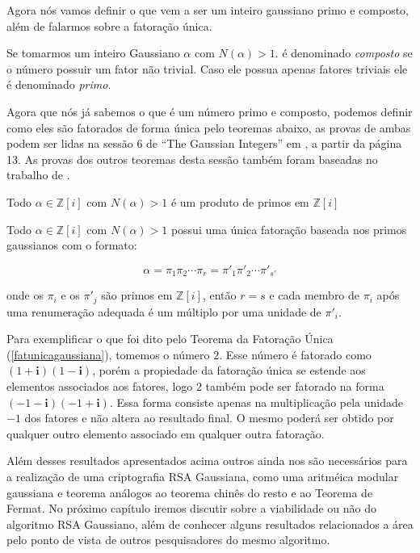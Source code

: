 Agora n\'os vamos definir o que vem a ser um inteiro gaussiano primo e composto, al\'em de falarmos sobre a fatora\c{c}\~ao \'unica.

\begin{Df}
Se tomarmos um inteiro Gaussiano $\alpha$ com $N(\alpha) > 1$. \'e denominado \textit{composto} se o n\'umero possuir um fator n\~ao trivial. Caso ele possua apenas fatores triviais ele \'e denominado \textit{primo}.
\end{Df}

Agora que n\'os j\'a sabemos o que \'e um n\'umero primo e composto, podemos definir como eles s\~ao fatorados de forma \'unica pelo teoremas abaixo, as provas de ambas podem ser lidas na sess\~ao 6 de ``The Gaussian Integers'' em \cite{conrad}, a partir da p\'agina 13. As provas dos outros teoremas desta sess\~ao tamb\'em foram baseadas no trabalho de \cite{conrad}.

\begin{Th}
 Todo $\alpha \in \mathbb{Z}[i]$ com $N(\alpha) > 1$ \'e um produto de primos em $\mathbb{Z}[i]$
\end{Th}

\begin{Th} \label{fatunicagaussiana}
 Todo $\alpha \in \mathbb{Z}[i]$ com $N(\alpha) > 1$ possui uma \'unica fatora\c{c}\~ao baseada nos primos gaussianos com o formato:

	$$\alpha = \pi_1 \pi_2 \cdots \pi_{r} = \pi'_1 \pi'_2 \cdots \pi'_{s'} $$

onde os $\pi_i$ e os $\pi'_j$ s\~ao primos em $\mathbb{Z}[i]$, ent\~ao $r=s$ e cada membro de $\pi_i$ ap\'os uma renumera\c{c}\~ao adequada \'e um m\'ultiplo por uma unidade de $\pi'_i$.

\end{Th}

Para exemplificar o que foi dito pelo Teorema da Fatora\c{c}\~ao \'Unica (\ref{fatunicagaussiana}), tomemos o n\'umero $2$. Esse n\'umero \'e fatorado como $(1 + \textbf{i})(1 - \textbf{i})$, por\'em a propiedade da fatora\c{c}\~ao \'unica se estende aos elementos associados aos fatores, logo $2$ tamb\'em pode ser fatorado na forma $(-1 - \textbf{i})(-1 + \textbf{i})$. Essa forma consiste apenas na multiplica\c{c}\~ao pela unidade $-1$ dos fatores e n\~ao altera ao resultado final. O mesmo poder\'a ser obtido por qualquer outro elemento associado em qualquer outra fatora\c{c}\~ao.

Al\'em desses resultados apresentados acima outros ainda nos s\~ao necess\'arios para a realiza\c{c}\~ao de uma criptografia RSA Gaussiana, como uma aritm\'eica modular gaussiana e teorema an\'alogos ao teorema chin\^es do resto e ao Teorema de Fermat. No pr\'oximo cap\'itulo iremos discutir sobre a viabilidade ou n\~ao do algoritmo RSA Gaussiano, al\'em de conhecer alguns resultados relacionados a \'area pelo ponto de vista de outros pesquisadores do mesmo algoritmo.